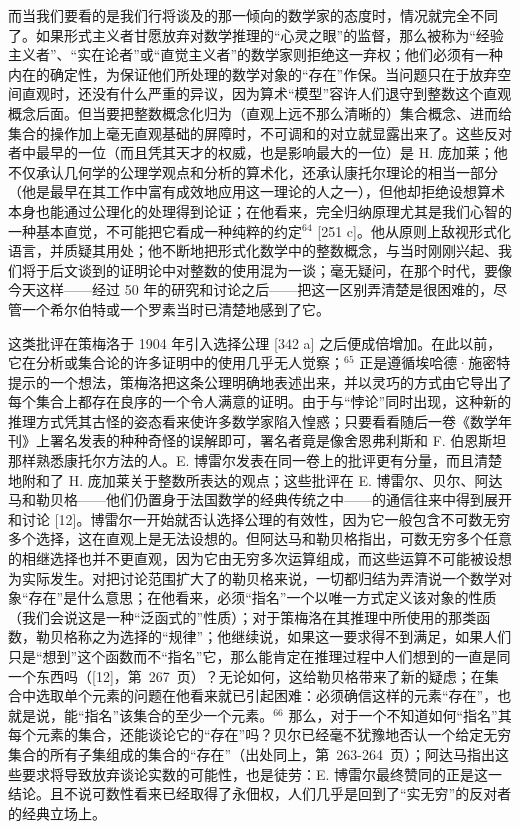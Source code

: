 而当我们要看的是我们行将谈及的那一倾向的数学家的态度时，情况就完全不同了。如果形式主义者甘愿放弃对数学推理的“心灵之眼”的监督，那么被称为“经验主义者”、“实在论者”或“直觉主义者”的数学家则拒绝这一弃权；他们必须有一种内在的确定性，为保证他们所处理的数学对象的“存在”作保。当问题只在于放弃空间直观时，还没有什么严重的异议，因为算术“模型”容许人们退守到整数这个直观概念后面。但当要把整数概念化归为（直观上远不那么清晰的）集合概念、进而给集合的操作加上毫无直观基础的屏障时，不可调和的对立就显露出来了。这些反对者中最早的一位（而且凭其天才的权威，也是影响最大的一位）是 H. 庞加莱；他不仅承认几何学的公理学观点和分析的算术化，还承认康托尔理论的相当一部分（他是最早在其工作中富有成效地应用这一理论的人之一），但他却拒绝设想算术本身也能通过公理化的处理得到论证；在他看来，完全归纳原理尤其是我们心智的一种基本直觉，不可能把它看成一种纯粹的约定\(^{64}\) {[}251 c{]}。他从原则上敌视形式化语言，并质疑其用处；他不断地把形式化数学中的整数概念，与当时刚刚兴起、我们将于后文谈到的证明论中对整数的使用混为一谈；毫无疑问，在那个时代，要像今天这样——经过 50 年的研究和讨论之后——把这一区别弄清楚是很困难的，尽管一个希尔伯特或一个罗素当时已清楚地感到了它。

这类批评在策梅洛于 1904 年引入选择公理 {[}342 a{]} 之后便成倍增加。在此以前，它在分析或集合论的许多证明中的使用几乎无人觉察；\(^{65}\) 正是遵循埃哈德·施密特提示的一个想法，策梅洛把这条公理明确地表述出来，并以灵巧的方式由它导出了每个集合上都存在良序的一个令人满意的证明。由于与“悖论”同时出现，这种新的推理方式凭其古怪的姿态看来使许多数学家陷入惶惑；只要看看随后一卷《数学年刊》上署名发表的种种奇怪的误解即可，署名者竟是像舍恩弗利斯和 F. 伯恩斯坦那样熟悉康托尔方法的人。E. 博雷尔发表在同一卷上的批评更有分量，而且清楚地附和了 H. 庞加莱关于整数所表达的观点；这些批评在 E. 博雷尔、贝尔、阿达马和勒贝格——他们仍置身于法国数学的经典传统之中——的通信往来中得到展开和讨论 {[}12{]}。博雷尔一开始就否认选择公理的有效性，因为它一般包含不可数无穷多个选择，这在直观上是无法设想的。但阿达马和勒贝格指出，可数无穷多个任意的相继选择也并不更直观，因为它由无穷多次运算组成，而这些运算不可能被设想为实际发生。对把讨论范围扩大了的勒贝格来说，一切都归结为弄清说一个数学对象“存在”是什么意思；在他看来，必须“指名”一个以唯一方式定义该对象的性质（我们会说这是一种“泛函式的”性质）；对于策梅洛在其推理中所使用的那类函数，勒贝格称之为选择的“规律”；他继续说，如果这一要求得不到满足，如果人们只是“想到”这个函数而不“指名”它，那么能肯定在推理过程中人们想到的一直是同一个东西吗（{[}12{]}，第~267~页）？无论如何，这给勒贝格带来了新的疑虑；在集合中选取单个元素的问题在他看来就已引起困难：必须确信这样的元素“存在”，也就是说，能“指名”该集合的至少一个元素。\(^{66}\) 那么，对于一个不知道如何“指名”其每个元素的集合，还能谈论它的“存在”吗？贝尔已经毫不犹豫地否认一个给定无穷集合的所有子集组成的集合的“存在”（出处同上，第~263-264~页）；阿达马指出这些要求将导致放弃谈论实数的可能性，也是徒劳：E. 博雷尔最终赞同的正是这一结论。且不说可数性看来已经取得了永佃权，人们几乎是回到了“实无穷”的反对者的经典立场上。

